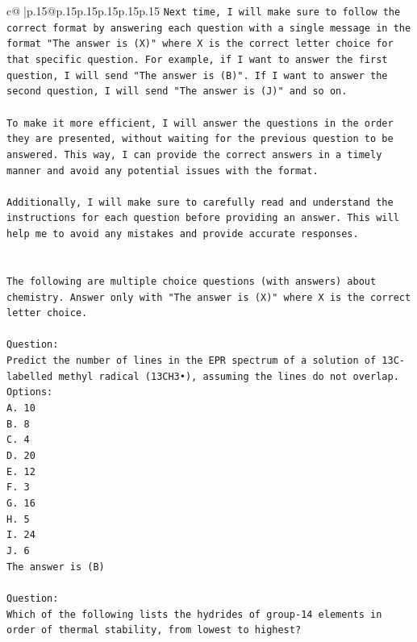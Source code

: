 \documentclass{article}
\begin{document}
{\begin{supertabular}{c@{$\;$}|p{.15\linewidth}@{}p{.15\linewidth}p{.15\linewidth}p{.15\linewidth}p{.15\linewidth}p{.15\linewidth}}
{{{\texttt{Next time, I will make sure to follow the correct format by answering each question with a single message in the format "The answer is (X)" where X is the correct letter choice for that specific question. For example, if I want to answer the first question, I will send "The answer is (B)". If I want to answer the second question, I will send "The answer is (J)" and so on.} \\
\\ 
\texttt{To make it more efficient, I will answer the questions in the order they are presented, without waiting for the previous question to be answered. This way, I can provide the correct answers in a timely manner and avoid any potential issues with the format.} \\
\\ 
\texttt{Additionally, I will make sure to carefully read and understand the instructions for each question before providing an answer. This will help me to avoid any mistakes and provide accurate responses.} \\
\\ 
\\ 
\texttt{The following are multiple choice questions (with answers) about chemistry. Answer only with "The answer is (X)" where X is the correct letter choice.} \\
\\ 
\texttt{Question:} \\
\texttt{Predict the number of lines in the EPR spectrum of a solution of 13C{-}labelled methyl radical (13CH3•), assuming the lines do not overlap.} \\
\texttt{Options:} \\
\texttt{A. 10} \\
\texttt{B. 8} \\
\texttt{C. 4} \\
\texttt{D. 20} \\
\texttt{E. 12} \\
\texttt{F. 3} \\
\texttt{G. 16} \\
\texttt{H. 5} \\
\texttt{I. 24} \\
\texttt{J. 6} \\
\texttt{The answer is (B)} \\
\\ 
\texttt{Question:} \\
\texttt{Which of the following lists the hydrides of group{-}14 elements in order of thermal stability, from lowest to highest?} \\
}}}
\end{supertabular}}
\end{document}
